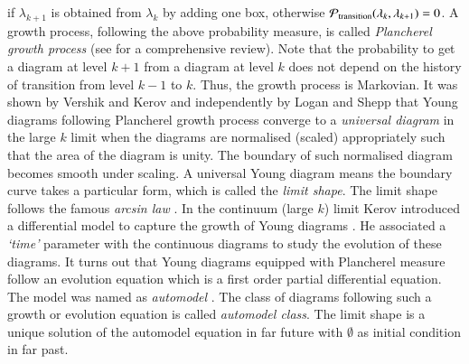 \documentclass[final,3p,12pt,times]{elsarticle}
\numberwithin{equation}{section}
\begin{document}
if $\lambda_{k+1}$ is obtained from $\lambda_k$ by adding one box, otherwise $\mathcal{P}_{\text{transition}}(\lambda_k,\lambda_{k+1})=0$. A growth process, following the above probability measure, is called \emph{Plancherel growth process} (see \cite{kerov_book,Hora:2237389} for a comprehensive review). Note that the probability to get a diagram at level $k+1$ from a diagram at level $k$ does not depend on the history of transition from level $k-1$ to $k$. Thus, the growth process is Markovian. It was shown by Vershik and Kerov \cite{VerKer77} and independently by Logan and Shepp \cite{LogShe} that Young diagrams following Plancherel growth process converge to a \emph{universal diagram} in the large $k$ limit when the diagrams are normalised (scaled) appropriately such that the area of the diagram is unity. The boundary of such normalised diagram becomes smooth under scaling. A universal Young diagram means the boundary curve takes a particular form, which is called the \emph{limit shape}. The limit shape follows the famous \emph{arcsin law} \cite{Kerov1,VerKer77}. In the continuum (large $k$) limit Kerov introduced a differential model to capture the growth of Young diagrams \cite{Kerov1,kerov_book}. He associated a \emph{`time'} parameter with the continuous diagrams to study the evolution of these diagrams. It turns out that Young diagrams equipped with Plancherel measure follow an evolution equation which is a first order partial differential equation. The model was named as \emph{automodel} \cite{Kerov1,kerov_book}. The class of diagrams following such a growth or evolution equation is called \emph{automodel class}. The limit shape is a unique solution of the automodel equation in far future with $\emptyset$ as initial condition in far past.
\end{document}
